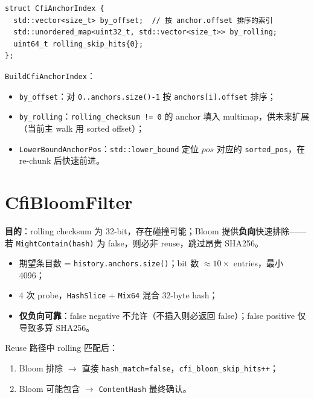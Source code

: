 \begin{lstlisting}[caption={CfiAnchorIndex 布局},label={lst:cfi-anchor-index}]
struct CfiAnchorIndex {
  std::vector<size_t> by_offset;  // 按 anchor.offset 排序的索引
  std::unordered_map<uint32_t, std::vector<size_t>> by_rolling;
  uint64_t rolling_skip_hits{0};
};
\end{lstlisting}

\texttt{BuildCfiAnchorIndex}：
\begin{itemize}[nosep]
  \item \texttt{by\_offset}：对 \texttt{0..anchors.size()-1} 按 \texttt{anchors[i].offset} 排序；
  \item \texttt{by\_rolling}：\texttt{rolling\_checksum != 0} 的 anchor 填入 multimap，供未来扩展（当前主 walk 用 sorted offset）；
  \item \texttt{LowerBoundAnchorPos}：\texttt{std::lower\_bound} 定位 $\mathit{pos}$ 对应的 \texttt{sorted\_pos}，在 re-chunk 后快速前进。
\end{itemize}

\section{CfiBloomFilter}
\label{sec:cfi-bloom}

\textbf{目的}：rolling checksum 为 32-bit，存在碰撞可能；Bloom 提供\textbf{负向}快速排除——若 \texttt{MightContain(hash)} 为 false，则必非 reuse，跳过昂贵 SHA256。

\begin{designbox}[Bloom 参数]
\begin{itemize}[nosep]
  \item 期望条目数 = \texttt{history.anchors.size()}；bit 数 $\approx 10\times$ entries，最小 4096；
  \item 4 次 probe，\texttt{HashSlice} + \texttt{Mix64} 混合 32-byte hash；
  \item \textbf{仅负向可靠}：false negative 不允许（不插入则必返回 false）；false positive 仅导致多算 SHA256。
\end{itemize}
\end{designbox}

Reuse 路径中 rolling 匹配后：
\begin{enumerate}[nosep]
  \item Bloom 排除 $\rightarrow$ 直接 \texttt{hash\_match=false}，\texttt{cfi\_bloom\_skip\_hits++}；
  \item Bloom 可能包含 $\rightarrow$ \texttt{ContentHash} 最终确认。
\end{enumerate}

